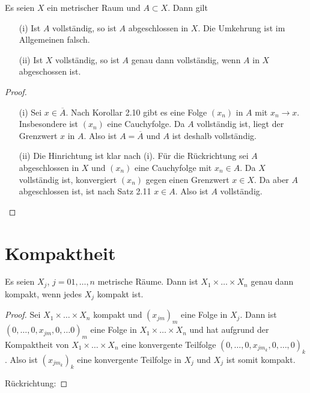 \setcounter{aufgabe}{20}
\begin{aufgabe}
	Es seien $X$ ein metrischer Raum und $A \subset X$. Dann gilt
	\begin{enumerate}
		\item[(i)] Ist $A$ vollständig, so ist $A$ abgeschlossen in $X$. Die Umkehrung ist im Allgemeinen
			falsch.
		\item[(ii)] Ist $X$ vollständig, so ist $A$ genau dann vollständig, wenn $A$ in $X$
			abgeschossen ist.
	\end{enumerate}
\end{aufgabe}
\begin{proof}
	\begin{enumerate}
		\item[(i)] Sei $x \in \overline A$. Nach Korollar 2.10 gibt es eine Folge $(x_n)$ in $A$
			mit $x_n \to x$. Insbesondere ist $(x_n)$ eine Cauchyfolge. Da $A$ vollständig ist, 
			liegt der Grenzwert $x$ in $A$. Also ist $A = \overline A$ und $A$ ist deshalb vollständig.
		\item[(ii)] Die Hinrichtung ist klar nach (i). Für die Rückrichtung sei $A$ abgeschlossen
			in $X$ und $(x_n)$ eine Cauchyfolge mit $x_n \in A$. Da $X$ vollständig ist, konvergiert
			$(x_n)$ gegen einen Grenzwert $x \in X$. Da aber $A$ abgeschlossen ist, ist nach
			Satz 2.11 $x \in A$. Also ist $A$ vollständig.
	\end{enumerate}
\end{proof}


\section{Kompaktheit}
\begin{aufgabe}
	Es seien $X_j$, $j = 01, \ldots, n$ metrische Räume. Dann ist $X_1 \times \dots \times X_n$ genau
	dann kompakt, wenn jedes $X_j$ kompakt ist.
\end{aufgabe}
\begin{proof}
	Sei $X_1 \times \dots \times X_n$ kompakt und $(x_{jm})_m$ eine Folge in $X_j$. Dann ist
	$(0, \ldots, 0, x_{jm}, 0, \ldots 0)_m$ eine Folge in $X_1 \times \dots \times X_n$ und hat
	aufgrund der Kompaktheit von $X_1 \times \dots \times X_n$ eine konvergente Teilfolge
	$(0, \ldots, 0, x_{jm_k}, 0, \ldots, 0)_k$. Also ist $(x_{jm_k})_k$ eine konvergente Teilfolge
	in $X_j$ und $X_j$ ist somit kompakt.

	Rückrichtung: %
\end{proof}

